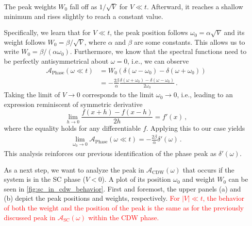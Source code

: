 \documentclass[
    reprint, 
    aps,
    preprintnumbers,
    twocolumn,
    prb,
    superscriptaddress
]{revtex4-2}
\newcommand{\spectral}[1]{\mathcal{A}_\text{#1}  (\omega)}
\begin{document}
The peak weights $W_0$ fall off as $1/\sqrt{V}$ for $V \ll t$. 
Afterward, it reaches a shallow minimum and rises slightly to reach a constant value.

Specifically, we learn that for $V \ll t$, the peak position follows $\omega_0 = \alpha \sqrt{V}$ and its weight follows $W_0 = \beta / \sqrt{V}$, 
where $\alpha$ and $\beta$ are some constants.
This allows us to write $W_0 = \beta / (\alpha \omega_0)$. 
Furthermore, we know that the spectral functions need to be perfectly antisymmetrical about $\omega = 0$, i.e., we can observe
\begin{align}
    \mathcal{A}_\text{Phase} (\omega \ll t) &= W_0 (\delta (\omega - \omega_0) - \delta (\omega + \omega_0)) \nonumber \\
        &= - \frac{2\beta}{\alpha} \frac{\delta (\omega + \omega_0) - \delta (\omega - \omega_0)}{2\omega_0} \,.
\end{align} 
Taking the limit of $V \to 0$ corresponds to the limit $\omega_0 \to 0$, i.e., leading to an expression reminiscent of symmetric derivative
\begin{equation}
    \lim_{h \to 0} \frac{f(x + h) - f(x - h)}{2h} = f'(x)\,,
\end{equation}
where the equality holds for any differentiable $f$.
Applying this to our case yields
\begin{align}
    \lim_{\omega_0 \to 0} \mathcal{A}_\text{Phase} (\omega \ll t) = - \frac{2 \beta}{\alpha} \delta'(\omega)\,.
\end{align}
This analysis reinforces our previous identification of the phase peak as $\delta' (\omega)$.


As a next step, we want to analyze the peak in $\spectral{CDW}$ that occurs if the system is in the SC phase ($V<0$).
A plot of its position $\omega_0$ and weight $W_0$ can be seen in \autoref{fig:sc_in_cdw_behavior}.
First and foremost, the upper panels (a) and (b) depict the peak positions and weights, respectively.
\textcolor{red}{For $|V| \ll t$, the behavior of both the weight and the position of the peak is the same as for the previously discussed peak in $\spectral{SC}$ within the CDW phase.}
\end{document}
